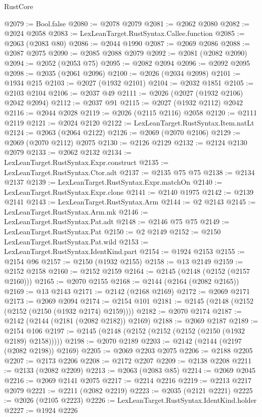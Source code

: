 \begin{lexlean}{RustCore}
\begin{coremodule}
@2079 := Bool.false
@2080 := @2078 @2079
@2081 := @2062 @2080
@2082 := @2024 @2058
@2083 := LexLeanTarget.RustSyntax.Callee.function
@2085 := @2063 (@2083 @80)
@2086 := @2044 @1990
@2087 := @2069 @2086
@2088 := @2087 @2075
@2090 := @2085 @2088 @2079
@2092 := @2081 (@2082 @2090)
@2094 := @2052 (@2053 @75)
@2095 := @2082 @2094
@2096 := @2092 @2095
@2098 := @2035 (@2061 @2096)
@2100 := @2026 (@2034 @2098)
@2101 := @1934 @215
@2103 := @2027 (@1932 @2101)
@2104 := @2032 @1851
@2105 := @2103 @2104
@2106 := @2037 @49
@2111 := @2026 (@2027 (@1932 @2106) @2042 @2094)
@2112 := @2037 @91
@2115 := @2027 (@1932 @2112) @2042
@2116 := @2044 @2028
@2119 := @2026 (@2115 @2116) @2058
@2120 := @2111 @2119
@2121 := @2024 @2120
@2122 := LexLeanTarget.RustSyntax.Item.natLt
@2124 := @2063 (@2064 @2122)
@2126 := @2069 (@2070 @2106)
@2129 := @2069 (@2070 @2112) @2075
@2130 := @2126 @2129
@2132 := @2124 @2130 @2079
@2133 := @2062 @2132
@2134 := LexLeanTarget.RustSyntax.Expr.construct
@2135 := LexLeanTarget.RustSyntax.Ctor.adt
@2137 := @2135 @75 @75
@2138 := @2134 @2137
@2139 := LexLeanTarget.RustSyntax.Expr.matchOn
@2140 := LexLeanTarget.RustSyntax.Expr.clone
@2141 := @2140 @1975
@2142 := @2139 @2141
@2143 := LexLeanTarget.RustSyntax.Arm
@2144 := @2 @2143
@2145 := LexLeanTarget.RustSyntax.Arm.mk
@2146 := LexLeanTarget.RustSyntax.Pat.adt
@2148 := @2146 @75 @75
@2149 := LexLeanTarget.RustSyntax.Pat
@2150 := @2 @2149
@2152 := @2150 LexLeanTarget.RustSyntax.Pat.wild
@2153 := LexLeanTarget.RustSyntax.IdentKind.part
@2154 := @1924 @2153
@2155 := @2154 @96
@2157 := @2150 (@1932 @2155)
@2158 := @13 @2149
@2159 := @2152 @2158
@2160 := @2152 @2159
@2164 := @2145 (@2148 (@2152 (@2157 @2160)))
@2165 := @2070 @2155
@2168 := @2144 (@2164 (@2082 @2165))
@2169 := @13 @2143
@2171 := @2142 (@2168 @2169)
@2172 := @2069 @2171
@2173 := @2069 @2094
@2174 := @2154 @101
@2181 := @2145 (@2148 (@2152 (@2152 (@2150 (@1932 @2174) @2159))))
@2182 := @2070 @2174
@2187 := @2142 (@2144 (@2181 (@2082 @2182)) @2169)
@2188 := @2069 @2187
@2189 := @2154 @106
@2197 := @2145 (@2148 (@2152 (@2152 (@2152 (@2150 (@1932 @2189) @2158)))))
@2198 := @2070 @2189
@2203 := @2142 (@2144 (@2197 (@2082 @2198)) @2169)
@2205 := @2069 @2203 @2075
@2206 := @2188 @2205
@2207 := @2173 @2206
@2208 := @2172 @2207
@2209 := @2138 @2208
@2211 := @2133 (@2082 @2209)
@2213 := @2063 (@2083 @85)
@2214 := @2069 @2045
@2216 := @2069 @2141 @2075
@2217 := @2214 @2216
@2219 := @2213 @2217 @2079
@2221 := @2211 (@2082 @2219)
@2223 := @2035 (@2121 @2221)
@2225 := @2026 (@2105 @2223)
@2226 := LexLeanTarget.RustSyntax.IdentKind.holder
@2227 := @1924 @2226

\end{coremodule}
\end{lexlean}
